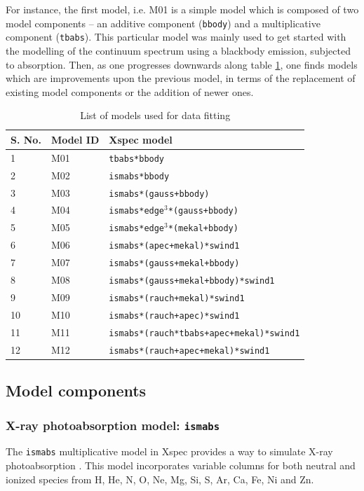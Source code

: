 		For instance, the first model, i.e. M01 is a simple model which is composed of two model components -- an additive component (\texttt{bbody}) and a multiplicative component (\texttt{tbabs}). This particular model was mainly used to get started with the modelling of the continuum spectrum using a blackbody emission, subjected to absorption. Then, as one progresses downwards along table \ref{xmm-rgs-model-list}, one finds models which are improvements upon the previous model, in terms of the replacement of existing model components or the addition of newer ones.
		\begin{table}[h!]
			\centering
			\caption{List of models used for data fitting}
			\label{xmm-rgs-model-list}
			\begin{tabular}{|l|l|l|}
				\hline
				\textbf{S. No.} & \textbf{Model ID} & \textbf{Xspec model} \\ \hline
				{1} & {M01} & \texttt{tbabs*bbody} \\ \hline
				{2} & {M02} & \texttt{ismabs*bbody} \\ \hline
				{3} & {M03} & \texttt{ismabs*(gauss+bbody)} \\ \hline
				{4} & {M04} & \texttt{ismabs*edge$^3$*(gauss+bbody)} \\ \hline
				{5} & {M05} & \texttt{ismabs*edge$^3$*(mekal+bbody)} \\ \hline
				{6} & {M06} & \texttt{ismabs*(apec+mekal)*swind1} \\ \hline
				{7} & {M07} & \texttt{ismabs*(gauss+mekal+bbody)} \\ \hline
				{8} & {M08} & \texttt{ismabs*(gauss+mekal+bbody)*swind1} \\ \hline
				{9} & {M09} & \texttt{ismabs*(rauch+mekal)*swind1} \\ \hline
				{10} & {M10} & \texttt{ismabs*(rauch+apec)*swind1} \\ \hline
				{11} & {M11} & \texttt{ismabs*(rauch*tbabs+apec+mekal)*swind1} \\ \hline
				{12} & {M12} & \texttt{ismabs*(rauch+apec+mekal)*swind1} \\ \hline
			\end{tabular}
		\end{table}
	
		\subsection{Model components} \label{hi-resolution:models:components}
		
			\subsubsection{X-ray photoabsorption model: \texttt{ismabs}}
			The \texttt{ismabs} multiplicative model in Xspec provides a way to simulate X-ray photoabsorption \cite{ismabs_gatuzz}. This model incorporates variable columns for both neutral and ionized species from H, He, N, O, Ne, Mg, Si, S, Ar, Ca, Fe, Ni and Zn.
			
